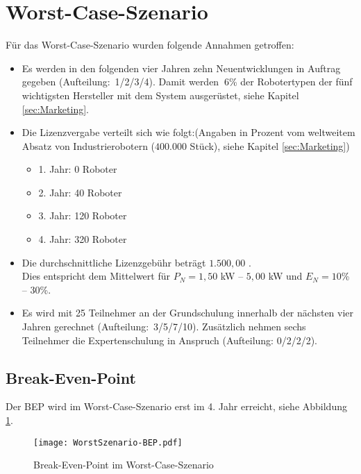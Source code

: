 \section{Worst-Case-Szenario}
Für das Worst-Case-Szenario wurden folgende Annahmen getroffen:
\begin{itemize}
	\item Es werden in den folgenden vier Jahren zehn Neuentwicklungen in Auftrag gegeben (Aufteilung:~1/2/3/4). Damit werden $~6$\% der Robotertypen der fünf wichtigsten Hersteller mit dem System ausgerüstet, siehe Kapitel \ref{sec:Marketing}.
	\item Die Lizenzvergabe verteilt sich wie folgt:\newline (Angaben in Prozent vom weltweitem Absatz von Industrierobotern ($400.000$ Stück), siehe Kapitel \ref{sec:Marketing})
	\begin{itemize}
		\item 1. Jahr: 0 Roboter
		\item 2. Jahr: 40 Roboter
		\item 3. Jahr: 120 Roboter
		\item 4. Jahr: 320 Roboter
	\end{itemize}
	\item Die durchschnittliche Lizenzgebühr beträgt $1.500,00$ \officialeuro.\\ Dies entspricht dem Mittelwert für $P_N = 1,50$ kW -- $5,00$ kW und $E_N = 10$\% -- $30$\%.
	\item Es wird mit 25 Teilnehmer an der Grundschulung innerhalb der nächsten vier Jahren gerechnet (Aufteilung:~3/5/7/10). Zusätzlich nehmen sechs Teilnehmer die Expertenschulung in Anspruch (Aufteilung: 0/2/2/2).
\end{itemize}

\subsection{Break-Even-Point}
Der BEP wird im Worst-Case-Szenario erst im 4. Jahr erreicht, siehe Abbildung \ref{fig:WorstSzenario-BEP}.
\begin{figure}[h]
	\centering
	\texttt{[image: WorstSzenario-BEP.pdf]}
	\caption{Break-Even-Point im Worst-Case-Szenario}
	\label{fig:WorstSzenario-BEP}
\end{figure}

